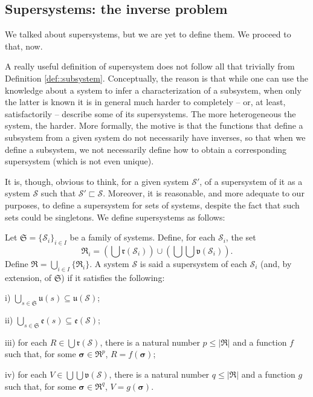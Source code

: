 \subsection{Supersystems: the inverse problem}

We talked about supersystems, but we are yet to define them. We proceed to that, now.

A really useful definition of supersystem does not follow all that trivially from Definition \ref{def::subsystem}. Conceptually, the reason is that while one can use the knowledge about a system to infer a characterization of a subsystem, when only the latter is known it is in general much harder to completely -- or, at least, satisfactorily -- describe some of its supersystems. The more heterogeneous the system, the harder. More formally, the motive is that the functions that define a subsystem from a given system do not necessarily have inverses, so that when we define a subsystem, we not necessarily define how to obtain a corresponding supersystem (which is not even unique). 

It is, though, obvious to think, for a given system $\mathcal{S}'$, of a supersystem of it as a system $\mathcal{S}$ such that $\mathcal{S}' \sqsubset \mathcal{S}$. Moreover, it is reasonable, and more adequate to our purposes, to define a supersystem for sets of systems, despite the fact that such sets could be singletons. We define supersystems as follows:

\begin{definition}[Supersystem] \label{def::supersystem}
	Let $\mathfrak{S} = \{\mathcal{S}_i\}_{i\in I}$ be a family of systems. Define, for each $\mathcal{S}_i$, the set 
	\[\mathfrak{R}_i = \left(\bigcup \mathfrak{r}(\mathcal{S}_i)\right) \cup \left(\bigcup \bigcup \mathfrak{v} (\mathcal{S}_i)\right).\]
	Define $\mathfrak{R} = \bigcup_{i\in I} \{\mathfrak{R}_i\}$. A system $\mathcal{S}$ is said a supersystem of each $\mathcal{S}_i$ (and, by extension, of $\mathfrak{S}$) if it satisfies the following:
	
	\noindent
	i) $\bigcup\limits_{s \in \mathfrak{S}} \mathfrak{u}(s) \subseteq \mathfrak{u}(\mathcal{S})$;
	
	\noindent
	ii) $\bigcup\limits_{s \in \mathfrak{S}} \mathfrak{e}(s) \subseteq \mathfrak{e}(\mathcal{S})$; 
	
	\noindent
	iii) for each $R \in \bigcup\mathfrak{r}(\mathcal{S})$, there is a natural number $p \leq |\mathfrak{R}|$ and a function $f$ such that, for some $\boldsymbol{\sigma} \in \mathfrak{R}^p$, $R = f(\boldsymbol{\sigma})$;
	
	\noindent
	iv) for each $V \in \bigcup\bigcup\mathfrak{v}(\mathcal{S})$, there is a natural number $q \leq |\mathfrak{R}|$ and a function $g$ such that, for some $\boldsymbol{\sigma} \in \mathfrak{R}^q$, $V = g(\boldsymbol{\sigma})$.
\end{definition}

